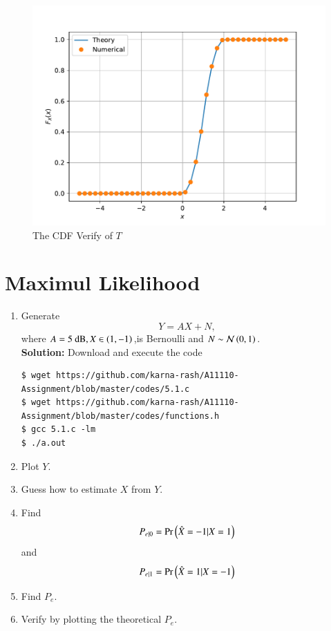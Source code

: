 \documentclass[journal,12pt,twocolumn]{IEEEtran}
\renewcommand\thesection{\arabic{section}}
\begin{document}
\begin{enumerate}[label=\thesection.\arabic*
,ref=\thesection.\theenumi]
\begin{figure}
\includegraphics[width=\columnwidth]{./figs/tri_cdf_verify}
\caption{The CDF Verify of $T$}
\label{fig:tri_cdf_verify}
\end{figure}
\end{enumerate}
\section{Maximul Likelihood}
\begin{enumerate}[label=\thesection.\arabic*
,ref=\thesection.\theenumi]
\item Generate 
\begin{equation}
Y = AX+N,
\end{equation}
		where   $A = 5 \text{ dB}, X \in \left(1,-1\right)$,is Bernoulli and $N \sim \mathcal{N}\left(0,1\right)$.\\
		\textbf{Solution:}
		Download and execute the code
		\begin{lstlisting}
$ wget https://github.com/karna-rash/A11110-Assignment/blob/master/codes/5.1.c
$ wget https://github.com/karna-rash/A11110-Assignment/blob/master/codes/functions.h
$ gcc 5.1.c -lm 
$ ./a.out 
	\end{lstlisting}
		
	\item Plot $Y$.
	
	\item Guess how to estimate $X$ from $Y$.
\item
\label{ml-ch4_sim}
Find 
\begin{equation}
	P_{e|0} = \Pr\left(\hat{X} = -1|X=1\right)
\end{equation}
and 
\begin{equation}
	P_{e|1} = \Pr\left(\hat{X} = 1|X=-1\right)
\end{equation}
%
\item Find $P_e$.
%
\item
Verify by plotting  the theoretical $P_e$.  
		\end{enumerate}
\end{document}
